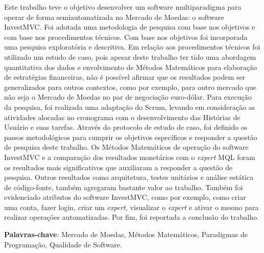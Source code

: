 \begin{resumo}
Este trabalho teve o objetivo desenvolver um software multiparadigma para operar de forma semiautomatizada no Mercado de Moedas: o software InvestMVC. Foi adotada uma metodologia de pesquisa com base nos objetivos e com base nos procedimentos técnicos. Com base nos objetivos foi incorporada uma pesquisa exploratória e descritiva. Em relação aos procedimentos técnicos foi utilizado um estudo de caso, pois apesar deste trabalho ter tido uma abordagem quantitativa dos dados e envolvimento de Métodos Matemáticos para elaboração de estratégias financeiras, não é possível afirmar que os resultados podem ser generalizados para outros contextos, como por exemplo, para outro mercado que não seja o Mercado de Moedas no par de negociação euro-dólar. Para execução da pesquisa, foi realizada uma adaptação do Scrum, levando em consideração as atividades alocadas no cronograma com o desenvolvimento das Histórias de Usuário e suas tarefas. Através do protocolo de estudo de caso, foi definido os passos metodológicos para cumprir os objetivos específicos e responder a questão de pesquisa deste trabalho. Os Métodos Matemáticos de operação do software InvestMVC e a comparação dos resultados monetários com o \textit{expert} MQL foram os resultados mais significativos que auxiliaram a responder a questão de pesquisa. Outros resultados como arquitetura, testes unitários e análise estática de código-fonte, também agregaram bastante valor ao trabalho. Também foi evidenciado atributos do software InvestMVC, como por exemplo, como criar uma conta, fazer login, criar um \textit{expert}, visualizar o \textit{expert} e ativar o mesmo para realizar operações automatizadas. Por fim, foi reportada a conclusão do trabalho.

\vspace{\onelineskip}
    
 \noindent
 \textbf{Palavras-chave}: Mercado de Moedas, Métodos Matemáticos, Paradigmas de Programação, Qualidade de Software.
\end{resumo}
